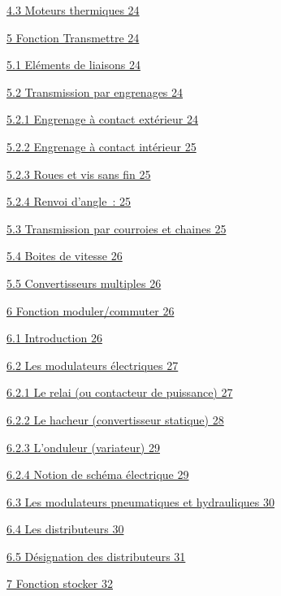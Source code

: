 \documentclass[
]{article}
\begin{document}
\protect\hyperlink{moteurs-thermiques}{4.3 Moteurs thermiques 24}

\protect\hyperlink{fonction-transmettre}{5 Fonction Transmettre 24}

\protect\hyperlink{eluxe9ments-de-liaisons}{5.1 Eléments de liaisons 24}

\protect\hyperlink{transmission-par-engrenages}{5.2 Transmission par
engrenages 24}

\protect\hyperlink{engrenage-uxe0-contact-extuxe9rieur}{5.2.1 Engrenage
à contact extérieur 24}

\protect\hyperlink{engrenage-uxe0-contact-intuxe9rieur}{5.2.2 Engrenage
à contact intérieur 25}

\protect\hyperlink{roues-et-vis-sans-fin}{5.2.3 Roues et vis sans fin
25}

\protect\hyperlink{renvoi-dangle}{5.2.4 Renvoi d'angle~: 25}

\protect\hyperlink{transmission-par-courroies-et-chaines}{5.3
Transmission par courroies et chaines 25}

\protect\hyperlink{boites-de-vitesse}{5.4 Boites de vitesse 26}

\protect\hyperlink{convertisseurs-multiples}{5.5 Convertisseurs
multiples 26}

\protect\hyperlink{fonction-modulercommuter}{6 Fonction moduler/commuter
26}

\protect\hyperlink{introduction}{6.1 Introduction 26}

\protect\hyperlink{les-modulateurs-uxe9lectriques}{6.2 Les modulateurs
électriques 27}

\protect\hyperlink{le-relai-ou-contacteur-de-puissance}{6.2.1 Le relai
(ou contacteur de puissance) 27}

\protect\hyperlink{le-hacheur-convertisseur-statique}{6.2.2 Le hacheur
(convertisseur statique) 28}

\protect\hyperlink{londuleur-variateur}{6.2.3 L'onduleur (variateur) 29}

\protect\hyperlink{notion-de-schuxe9ma-uxe9lectrique}{6.2.4 Notion de
schéma électrique 29}

\protect\hyperlink{les-modulateurs-pneumatiques-et-hydrauliques}{6.3 Les
modulateurs pneumatiques et hydrauliques 30}

\protect\hyperlink{les-distributeurs}{6.4 Les distributeurs 30}

\protect\hyperlink{duxe9signation-des-distributeurs}{6.5 Désignation des
distributeurs 31}

\protect\hyperlink{fonction-stocker}{7 Fonction stocker 32}
\end{document}
